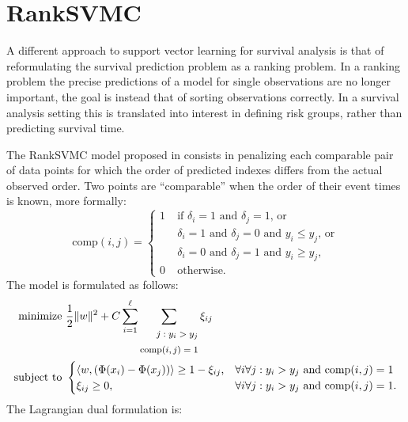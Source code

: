 \documentclass[12pt]{report}
\begin{document}
\section{RankSVMC}
A different approach to support vector learning for survival analysis is that of reformulating the survival prediction problem as a ranking problem. In a ranking problem the precise predictions of a model for single observations are no longer important, the goal is instead that of sorting observations correctly. In a survival analysis setting this is translated into interest in defining risk groups, rather than predicting survival time.

The RankSVMC model proposed in \cite{vanbelle07,evers08} consists in penalizing each comparable pair of data points for which the order of predicted indexes differs from the actual observed order. Two points are ``comparable'' when the order of their event times is known, more formally:
\begin{equation} \label{comparable}
\text{comp}(i,j) = \begin{cases}
1 \; &\text{if } \delta_{i} = 1 \text{ and } \delta_{j} = 1 \text{, or}\\
&\delta_{i} = 1 \text{ and } \delta_{j} = 0 \text{ and } y_{i} \leq y_{j} \text{, or}\\
&\delta_{i} = 0 \text{ and } \delta_{j} = 1 \text{ and } y_{i} \geq y_{j} \text{,}\\
0 \; &\text{otherwise.}
\end{cases}
\end{equation}
The model is formulated as follows:
\begin{equation} \label{ranksvmcprimal}
\begin{split}
\text{minimize} &\ \dfrac{1}{2}\| w \|^2 + C\sum_{i=1}^{\ell}\sum_{\footnotesize\begin{split} j:y_{i} > y_{j} \\ \text{comp}(i,j) = 1 \end{split}}\xi_{ij} \\
\text{subject to} &\ \begin{cases}
\langle w,(\Phi(x_{i}) - \Phi(x_{j})) \rangle \geq 1 - \xi_{ij} \text{,} &\forall i \forall j : y_{i} > y_{j} \text{ and comp}(i,j) = 1\\
\xi_{ij} \geq 0 \text{,} &\forall i \forall j : y_{i} > y_{j} \text{ and comp}(i,j) = 1 \text{.}
\end{cases}
\end{split}
\end{equation}
The Lagrangian dual formulation is:
\end{document}
